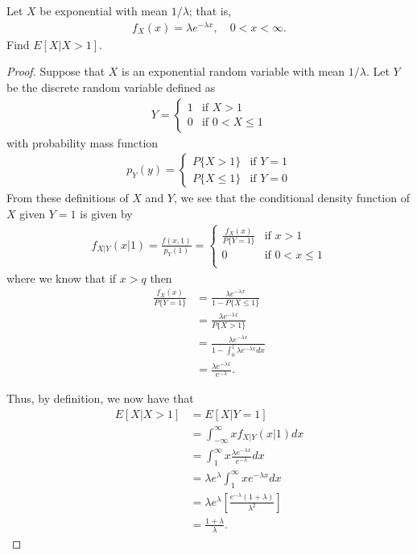 \begin{problem}{3.13}
  Let $X$ be exponential with mean $1/\lambda$; that is,
  \begin{align*}
    f_{X}(x) = \lambda e^{-\lambda x}, \quad 0 < x < \infty.
  \end{align*}
  Find $E[X|X>1]$.
\end{problem}

\begin{proof}
  Suppose that $X$ is an exponential random variable with mean $1/\lambda$. Let $Y$
  be the discrete random variable defined as
  \begin{align*}
    Y =
    \begin{cases}
      1 & \text{if $X > 1$} \\
      0 & \text{if $0 < X \leq 1$}
    \end{cases}
  \end{align*}
  with probability mass function
  \begin{align*}
    p_Y(y) =
    \begin{cases}
      P\{X > 1\} & \text{if $Y = 1$} \\
      P\{X \leq 1\} & \text{if $Y = 0$}
    \end{cases}
  \end{align*}
  From these definitions of $X$ and $Y$, we see that the conditional density function of $X$ given $Y=1$ is
  given by
  \begin{align*}
    f_{X|Y}(x|1) = \frac{f(x, 1)}{p_Y(1)} =
    \begin{cases}
      \frac{f_X(x)}{P\{Y=1\}} & \text{if $x > 1$}\\
      0 & \text{if $0 < x \leq 1$} \\
    \end{cases}
  \end{align*}
  where we know that if $x > q$ then
  \begin{align*}
    \frac{f_X(x)}{P\{Y=1\}}
    &= \frac{\lambda e^{-\lambda x}}{1 - P\{X \leq 1\}} \\
    &= \frac{\lambda e^{-\lambda x}}{P\{X > 1\}}\\
    &= \frac{\lambda e^{-\lambda x}}{1 - \int_0^1\lambda e^{-\lambda x}dx }\\
    &= \frac{\lambda e^{-\lambda x}}{e^{-\lambda}}.
  \end{align*}

  Thus, by definition, we now have that
  \begin{align*}
    E[X | X > 1] &= E[X | Y = 1] \\
    &= \int_{-\infty}^\infty x f_{X|Y}(x|1) dx \\
    &= \int_{1}^\infty x \frac{\lambda e^{-\lambda x}}{e^{-\lambda}} dx \\
    &= \lambda {e^{\lambda}}\int_{1}^\infty x e^{-\lambda x} dx \\
    &= \lambda {e^{\lambda}}\left[\frac{e^{-\lambda}(1 + \lambda)}{\lambda^2}\right]\\
    &= \frac{1 + \lambda}{\lambda}.
  \end{align*}
\end{proof}
\newpage
